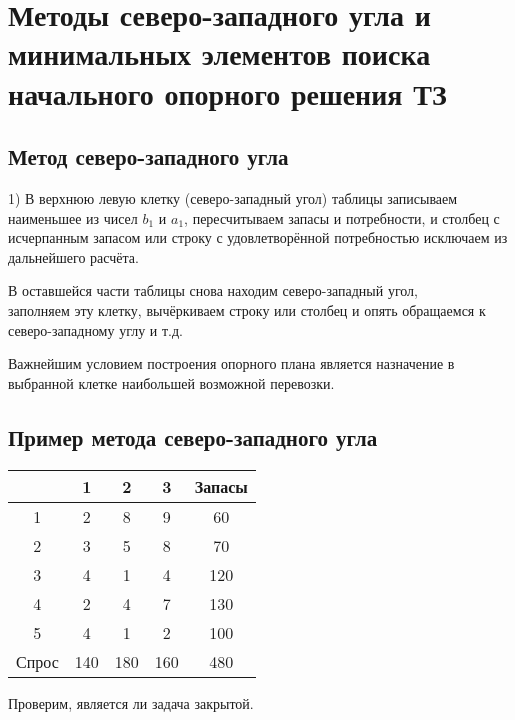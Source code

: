 \documentclass[17pt]{extarticle}
\begin{document}
\section{Методы северо-западного угла и минимальных элементов поиска начального опорного решения ТЗ}

\subsection{Метод северо-западного угла}
1) В верхнюю левую клетку (северо-западный угол) таблицы записываем наименьшее из чисел \( b_1 \) и \( a_1 \),
пересчитываем запасы и потребности,
и столбец с исчерпанным запасом или строку с удовлетворённой потребностью исключаем из дальнейшего расчёта.

В оставшейся части таблицы снова находим северо-западный угол, \\ заполняем эту клетку,
вычёркиваем строку или столбец и опять обращаемся к северо-западному углу и т.д.

Важнейшим условием построения опорного плана является назначение в выбранной клетке наибольшей возможной перевозки.

\subsection{Пример метода северо-западного угла}
\begin{center}
    \begin{tabular}{|c|c|c|c|c|}
        \hline
              & 1   & 2   & 3   & Запасы \\
        \hline
        1     & 2   & 8   & 9   & 60     \\
        \hline
        2     & 3   & 5   & 8   & 70     \\
        \hline
        3     & 4   & 1   & 4   & 120    \\
        \hline
        4     & 2   & 4   & 7   & 130    \\
        \hline
        5     & 4   & 1   & 2   & 100    \\
        \hline
        Спрос & 140 & 180 & 160 & 480    \\
        \hline
    \end{tabular}
\end{center}

Проверим, является ли задача закрытой.
\end{document}
